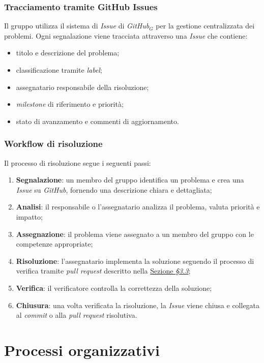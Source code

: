 \documentclass[10pt, letterpaper]{article}
\begin{document}
\subsubsection{Tracciamento tramite GitHub Issues}
Il gruppo utilizza il sistema di \textit{Issue} di \textit{GitHub}$_{G}$ per la gestione
centralizzata dei problemi. Ogni segnalazione viene tracciata attraverso una
\textit{Issue} che contiene:
\begin{itemize}
    \item titolo e descrizione del problema;
    \item classificazione tramite \textit{label};
    \item assegnatario responsabile della risoluzione;
    \item \textit{milestone} di riferimento e priorità;
    \item stato di avanzamento e commenti di aggiornamento.
\end{itemize}

\subsubsection{Workflow di risoluzione}
Il processo di risoluzione segue i seguenti passi:
\begin{enumerate}
    \item \textbf{Segnalazione}: un membro del gruppo identifica un problema e crea
          una \textit{Issue} su \textit{GitHub}, fornendo una descrizione chiara e dettagliata;
    \item \textbf{Analisi}: il responsabile o l'assegnatario analizza il problema,
          valuta priorità e impatto;
    \item \textbf{Assegnazione}: il problema viene assegnato a un membro del gruppo
          con le competenze appropriate;
    \item \textbf{Risoluzione}: l'assegnatario implementa la soluzione seguendo il
          processo di verifica tramite \textit{pull request} descritto nella \hyperref[sec:Verifica]{Sezione \textit{§3.3}};
    \item \textbf{Verifica}: il verificatore controlla la correttezza della soluzione;
    \item \textbf{Chiusura}: una volta verificata la risoluzione, la \textit{Issue}
          viene chiusa e collegata al \textit{commit} o alla \textit{pull request} risolutiva.
\end{enumerate}


\section{Processi organizzativi}
\end{document}
